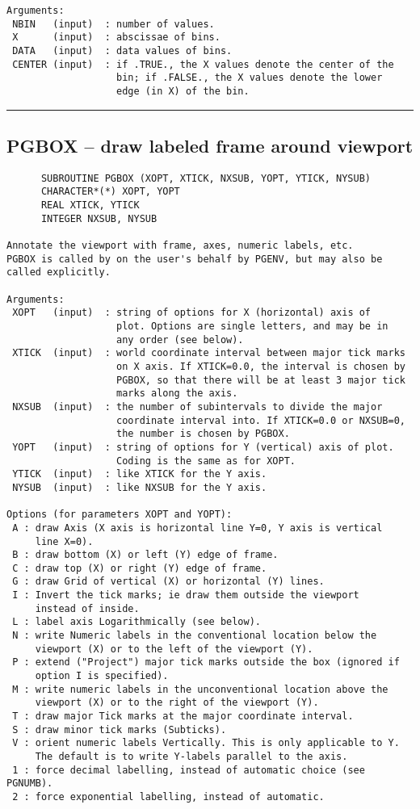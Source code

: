 {\begin{verbatim}
Arguments:
 NBIN   (input)  : number of values.
 X      (input)  : abscissae of bins.
 DATA   (input)  : data values of bins.
 CENTER (input)  : if .TRUE., the X values denote the center of the
                   bin; if .FALSE., the X values denote the lower
                   edge (in X) of the bin.
\end{verbatim}
\hrule


\subsection*{PGBOX -- draw labeled frame around viewport }
\begin{verbatim}
      SUBROUTINE PGBOX (XOPT, XTICK, NXSUB, YOPT, YTICK, NYSUB)
      CHARACTER*(*) XOPT, YOPT
      REAL XTICK, YTICK
      INTEGER NXSUB, NYSUB

Annotate the viewport with frame, axes, numeric labels, etc.
PGBOX is called by on the user's behalf by PGENV, but may also be
called explicitly.

Arguments:
 XOPT   (input)  : string of options for X (horizontal) axis of
                   plot. Options are single letters, and may be in
                   any order (see below).
 XTICK  (input)  : world coordinate interval between major tick marks
                   on X axis. If XTICK=0.0, the interval is chosen by
                   PGBOX, so that there will be at least 3 major tick
                   marks along the axis.
 NXSUB  (input)  : the number of subintervals to divide the major
                   coordinate interval into. If XTICK=0.0 or NXSUB=0,
                   the number is chosen by PGBOX.
 YOPT   (input)  : string of options for Y (vertical) axis of plot.
                   Coding is the same as for XOPT.
 YTICK  (input)  : like XTICK for the Y axis.
 NYSUB  (input)  : like NXSUB for the Y axis.

Options (for parameters XOPT and YOPT):
 A : draw Axis (X axis is horizontal line Y=0, Y axis is vertical
     line X=0).
 B : draw bottom (X) or left (Y) edge of frame.
 C : draw top (X) or right (Y) edge of frame.
 G : draw Grid of vertical (X) or horizontal (Y) lines.
 I : Invert the tick marks; ie draw them outside the viewport
     instead of inside.
 L : label axis Logarithmically (see below).
 N : write Numeric labels in the conventional location below the
     viewport (X) or to the left of the viewport (Y).
 P : extend ("Project") major tick marks outside the box (ignored if
     option I is specified).
 M : write numeric labels in the unconventional location above the
     viewport (X) or to the right of the viewport (Y).
 T : draw major Tick marks at the major coordinate interval.
 S : draw minor tick marks (Subticks).
 V : orient numeric labels Vertically. This is only applicable to Y.
     The default is to write Y-labels parallel to the axis.
 1 : force decimal labelling, instead of automatic choice (see PGNUMB).
 2 : force exponential labelling, instead of automatic.


\end{verbatim}}
